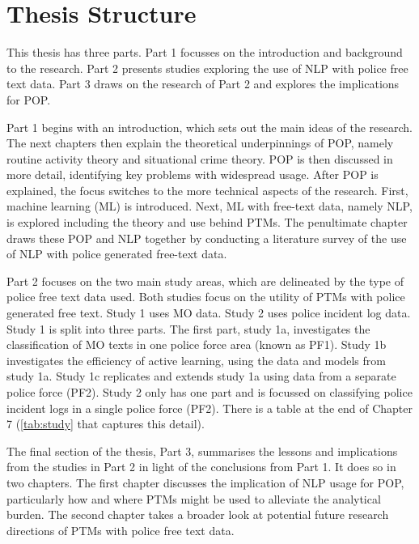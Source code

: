 \section{Thesis Structure} This thesis has three parts. Part 1 focusses on the introduction and background to the research. Part 2 presents studies exploring the use of NLP with police free text data. Part 3 draws on the research of Part 2 and explores the implications for POP.

Part 1 begins with an introduction, which sets out the main ideas of the research. The next chapters then explain the theoretical underpinnings of POP, namely routine activity theory and situational crime theory. POP is then discussed in more detail, identifying key problems with widespread usage. After POP is explained, the focus switches to the more technical aspects of the research. First, machine learning (ML) is introduced. Next, ML with free-text data, namely NLP, is explored including the theory and use behind PTMs. The penultimate chapter draws these POP and NLP together by conducting a literature survey of the use of NLP with police generated free-text data.

Part 2 focuses on the two main study areas, which are delineated by the type of police free text data used. Both studies focus on the utility of PTMs with police generated free text. Study 1 uses MO data. Study 2 uses police incident log data. Study 1 is split into three parts. The first part, study 1a, investigates the classification of MO texts in one police force area (known as PF1). Study 1b investigates the efficiency of active learning, using the data and models from study 1a. Study 1c replicates and extends study 1a using data from a separate police force (PF2). Study 2 only has one part and is focussed on classifying police incident logs in a single police force (PF2). There is a table at the end of Chapter 7 (\ref{tab:study} that captures this detail).

The final section of the thesis, Part 3, summarises the lessons and implications from the studies in Part 2 in light of the conclusions from Part 1. It does so in two chapters. The first chapter discusses the implication of NLP usage for POP, particularly how and where PTMs might be used to alleviate the analytical burden. The second chapter takes a broader look at potential future research directions of PTMs with police free text data.




